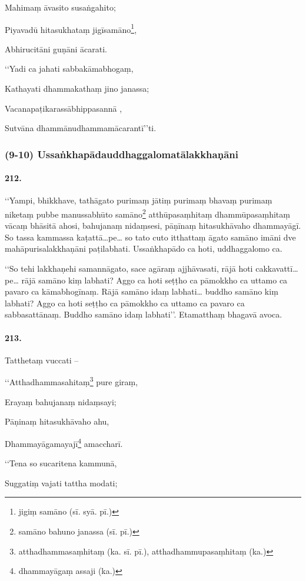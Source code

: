 Mahimaṃ āvasito susaṅgahito;

Piyavadū hitasukhataṃ jigīsamāno\footnote{jigiṃ samāno (sī. syā. pī.)},

Abhirucitāni guṇāni ācarati.

‘‘Yadi ca jahati sabbakāmabhogaṃ,

Kathayati dhammakathaṃ jino janassa;

Vacanapaṭikarassābhippasannā ,

Sutvāna dhammānudhammamācarantī’’ti.

\subsubsection{(9-10) Ussaṅkhapādauddhaggalomatālakkhaṇāni}

\paragraph{212.} ‘‘Yampi, bhikkhave, tathāgato purimaṃ jātiṃ purimaṃ bhavaṃ purimaṃ niketaṃ pubbe manussabhūto samāno\footnote{samāno bahuno janassa (sī. pī.)} atthūpasaṃhitaṃ dhammūpasaṃhitaṃ vācaṃ bhāsitā ahosi, bahujanaṃ nidaṃsesi, pāṇīnaṃ hitasukhāvaho dhammayāgī. So tassa kammassa kaṭattā…pe… so tato cuto itthattaṃ āgato samāno imāni dve mahāpurisalakkhaṇāni paṭilabhati. Ussaṅkhapādo ca hoti, uddhaggalomo ca.

‘‘So tehi lakkhaṇehi samannāgato, sace agāraṃ ajjhāvasati, rājā hoti cakkavattī…pe… rājā samāno kiṃ labhati? Aggo ca hoti seṭṭho ca pāmokkho ca uttamo ca pavaro ca kāmabhogīnaṃ. Rājā samāno idaṃ labhati… buddho samāno kiṃ labhati? Aggo ca hoti seṭṭho ca pāmokkho ca uttamo ca pavaro ca sabbasattānaṃ. Buddho samāno idaṃ labhati’’. Etamatthaṃ bhagavā avoca.

\paragraph{213.} Tatthetaṃ vuccati –

‘‘Atthadhammasahitaṃ\footnote{atthadhammasaṃhitaṃ (ka. sī. pī.), atthadhammupasaṃhitaṃ (ka.)} pure giraṃ,

Erayaṃ bahujanaṃ nidaṃsayi;

Pāṇinaṃ hitasukhāvaho ahu,

Dhammayāgamayajī\footnote{dhammayāgaṃ assaji (ka.)} amaccharī.

‘‘Tena so sucaritena kammunā,

Suggatiṃ vajati tattha modati;

